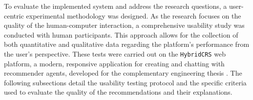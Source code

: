 To evaluate the implemented system and address the research questions, a user-centric experimental methodology was designed. As the research focuses on the quality of the human-computer interaction, a comprehensive usability study was conducted with human participants. This approach allows for the collection of both quantitative and qualitative data regarding the platform's performance from the user's perspective. These tests were carried out on the \texttt{HybridCRS} web platform, a modern, responsive application for creating and chatting with recommender agents, developed for the complementary engineering thesis \cite{MUII_THESIS}. The following subsections detail the usability testing protocol and the specific criteria used to evaluate the quality of the recommendations and their explanations.